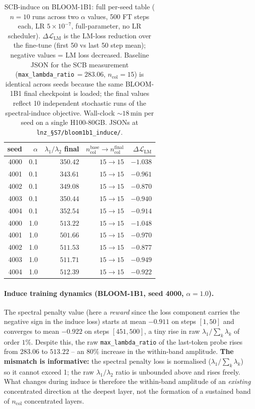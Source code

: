 \documentclass[11pt,a4paper]{article}
\begin{document}
\begin{table}[h]
\centering
\small
\caption{SCB-induce on BLOOM-1B1: full per-seed table
($n\!=\!10$ runs across two $\alpha$ values, 500 FT steps each,
LR $5\!\times\!10^{-7}$, full-parameter, no LR scheduler).
$\Delta\mathcal{L}_\mathrm{LM}$ is the LM-loss reduction over the
fine-tune (first 50 vs last 50 step mean); negative values =
LM loss decreased. Baseline JSON for the SCB measurement
(\texttt{max\_lambda\_ratio}\,$=\!283.06$, $n_\mathrm{col}\!=\!15$)
is identical across seeds because the same BLOOM-1B1 final
checkpoint is loaded; the final values reflect 10 independent
stochastic runs of the spectral-induce objective. Wall-clock
$\sim\!18$\,min per seed on a single H100-80GB. JSONs at
\texttt{lnz\_§S7/bloom1b1\_induce/}.}
\label{tab:S7-induce-perseed}
\begin{tabular}{rrrrr}
\toprule
seed & $\alpha$ & $\lambda_1/\lambda_2$ final & $n_\mathrm{col}^\mathrm{base}\!\to\!n_\mathrm{col}^\mathrm{final}$ & $\Delta\mathcal{L}_\mathrm{LM}$ \\
\midrule
4000 & 0.1 & $350.42$ & $15 \to 15$ & $-1.038$ \\
4001 & 0.1 & $343.61$ & $15 \to 15$ & $-0.961$ \\
4002 & 0.1 & $349.08$ & $15 \to 15$ & $-0.870$ \\
4003 & 0.1 & $350.44$ & $15 \to 15$ & $-0.940$ \\
4004 & 0.1 & $352.54$ & $15 \to 15$ & $-0.914$ \\
\midrule
4000 & 1.0 & $513.22$ & $15 \to 15$ & $-1.048$ \\
4001 & 1.0 & $501.66$ & $15 \to 15$ & $-0.970$ \\
4002 & 1.0 & $511.53$ & $15 \to 15$ & $-0.877$ \\
4003 & 1.0 & $511.71$ & $15 \to 15$ & $-0.949$ \\
4004 & 1.0 & $512.39$ & $15 \to 15$ & $-0.922$ \\
\bottomrule
\end{tabular}
\end{table}

\paragraph{Induce training dynamics (BLOOM-1B1, seed 4000, $\alpha\!=\!1.0$).}
The spectral penalty value (here a \emph{reward} since the loss
component carries the negative sign in the induce loss) starts at
mean $-0.911$ on steps $[1,50]$ and converges to mean $-0.922$ on
steps $[451,500]$, a tiny rise in raw $\lambda_1/\sum_k\lambda_k$
of order $1\%$. Despite this, the raw \texttt{max\_lambda\_ratio}
of the last-token probe rises from $283.06$ to $513.22$ -- an
$80\%$ increase in the within-band amplitude. \textbf{The mismatch
is informative:} the spectral penalty loss is normalised
($\lambda_1/\sum_k\lambda_k$) so it cannot exceed 1; the raw
$\lambda_1/\lambda_2$ ratio is unbounded above and rises freely.
What changes during induce is therefore the within-band amplitude
of an \emph{existing} concentrated direction at the deepest layer,
not the formation of a sustained band of $n_\mathrm{col}$ concentrated
layers.
\end{document}
